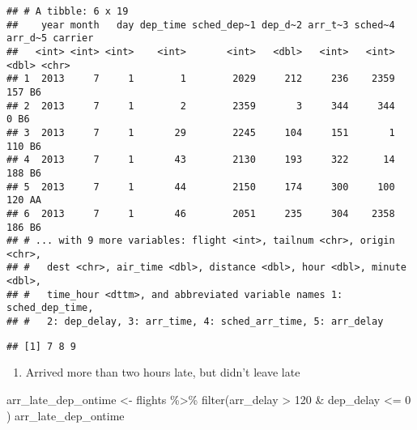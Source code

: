 \documentclass[
]{article}
\newenvironment{Shaded}{\begin{snugshade}}{\end{snugshade}}
\newcommand{\DecValTok}[1]{\textcolor[rgb]{0.00,0.00,0.81}{#1}}
\newcommand{\FunctionTok}[1]{\textcolor[rgb]{0.00,0.00,0.00}{#1}}
\newcommand{\NormalTok}[1]{#1}
\newcommand{\OtherTok}[1]{\textcolor[rgb]{0.56,0.35,0.01}{#1}}
\newcommand{\SpecialCharTok}[1]{\textcolor[rgb]{0.00,0.00,0.00}{#1}}
\providecommand{\tightlist}{%
  \setlength{\itemsep}{0pt}\setlength{\parskip}{0pt}}
\begin{document}
\begin{verbatim}
## # A tibble: 6 x 19
##    year month   day dep_time sched_dep~1 dep_d~2 arr_t~3 sched~4 arr_d~5 carrier
##   <int> <int> <int>    <int>       <int>   <dbl>   <int>   <int>   <dbl> <chr>  
## 1  2013     7     1        1        2029     212     236    2359     157 B6     
## 2  2013     7     1        2        2359       3     344     344       0 B6     
## 3  2013     7     1       29        2245     104     151       1     110 B6     
## 4  2013     7     1       43        2130     193     322      14     188 B6     
## 5  2013     7     1       44        2150     174     300     100     120 AA     
## 6  2013     7     1       46        2051     235     304    2358     186 B6     
## # ... with 9 more variables: flight <int>, tailnum <chr>, origin <chr>,
## #   dest <chr>, air_time <dbl>, distance <dbl>, hour <dbl>, minute <dbl>,
## #   time_hour <dttm>, and abbreviated variable names 1: sched_dep_time,
## #   2: dep_delay, 3: arr_time, 4: sched_arr_time, 5: arr_delay
\end{verbatim}

\begin{Shaded}
\end{Shaded}

\begin{verbatim}
## [1] 7 8 9
\end{verbatim}

\begin{enumerate}
\def\labelenumi{\alph{enumi})}
\setcounter{enumi}{4}
\tightlist
\item
  Arrived more than two hours late, but didn't leave late
\end{enumerate}

\begin{Shaded}
\begin{Highlighting}[]
\NormalTok{arr\_late\_dep\_ontime }\OtherTok{\textless{}{-}}\NormalTok{ flights }\SpecialCharTok{\%\textgreater{}\%} \FunctionTok{filter}\NormalTok{(arr\_delay }\SpecialCharTok{\textgreater{}} \DecValTok{120} \SpecialCharTok{\&}\NormalTok{ dep\_delay }\SpecialCharTok{\textless{}=} \DecValTok{0}\NormalTok{ )}
\NormalTok{arr\_late\_dep\_ontime}
\end{Highlighting}
\end{Shaded}
\end{document}
